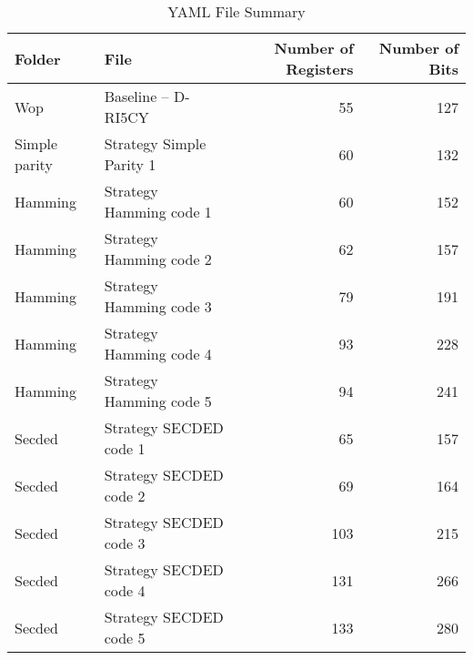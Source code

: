 \begin{table}
	\caption{YAML File Summary}
	\label{tab:yaml_summary}
	\begin{tabular}{llrr}
		\toprule
		Folder        & File                     & Number of Registers & Number of Bits \\
		\midrule
		Wop           & Baseline -- D-RI5CY      & 55                  & 127            \\
		Simple parity & Strategy Simple Parity 1 & 60                  & 132            \\
		Hamming       & Strategy Hamming code 1  & 60                  & 152            \\
		Hamming       & Strategy Hamming code 2  & 62                  & 157            \\
		Hamming       & Strategy Hamming code 3  & 79                  & 191            \\
		Hamming       & Strategy Hamming code 4  & 93                  & 228            \\
		Hamming       & Strategy Hamming code 5  & 94                  & 241            \\
		Secded        & Strategy SECDED code 1   & 65                  & 157            \\
		Secded        & Strategy SECDED code 2   & 69                  & 164            \\
		Secded        & Strategy SECDED code 3   & 103                 & 215            \\
		Secded        & Strategy SECDED code 4   & 131                 & 266            \\
		Secded        & Strategy SECDED code 5   & 133                 & 280            \\
		\bottomrule
	\end{tabular}
\end{table}
